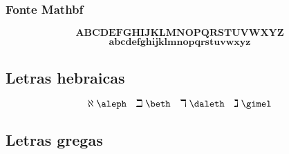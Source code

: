 \subsubsection{Fonte Mathbf}
\begin{equation*}
    \mathbf{A}\mathbf{B}\mathbf{C}\mathbf{D}\mathbf{E}\mathbf{F}\mathbf{G}\mathbf{H}\mathbf{I}\mathbf{J}\mathbf{K}\mathbf{L}\mathbf{M}\mathbf{N}\mathbf{O}\mathbf{P}\mathbf{Q}\mathbf{R}\mathbf{S}\mathbf{T}\mathbf{U}\mathbf{V}\mathbf{W}\mathbf{X}\mathbf{Y}\mathbf{Z}
\end{equation*}
\begin{equation*}
    \mathbf{a}\mathbf{b}\mathbf{c}\mathbf{d}\mathbf{e}\mathbf{f}\mathbf{g}\mathbf{h}\mathbf{i}\mathbf{j}\mathbf{k}\mathbf{l}\mathbf{m}\mathbf{n}\mathbf{o}\mathbf{p}\mathbf{q}\mathbf{r}\mathbf{s}\mathbf{t}\mathbf{u}\mathbf{v}\mathbf{w}\mathbf{x}\mathbf{y}\mathbf{z}
\end{equation*}

\subsection{Letras hebraicas}
\begin{equation*}
    \aleph \; \verb|\aleph| \quad \beth \; \verb|\beth| \quad \daleth \; \verb|\daleth| \quad \gimel \; \verb|\gimel|
\end{equation*}

\newpage
\subsection{Letras gregas}


